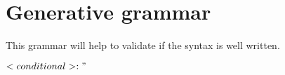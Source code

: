 \section{Generative grammar}
This grammar will help to validate if the syntax is well written.

$<conditional>: "$
